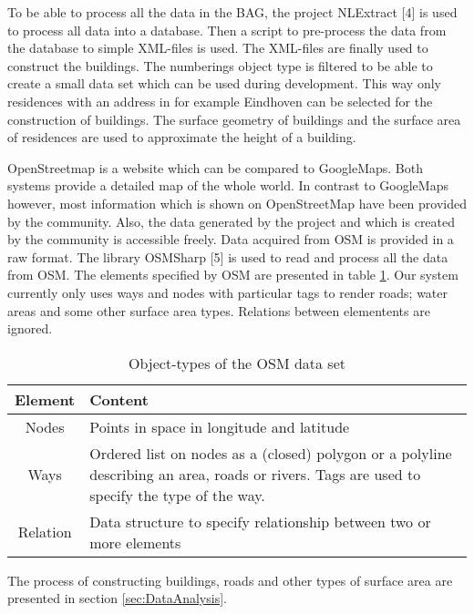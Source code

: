 To be able to process all the data in the BAG, the project NLExtract [4] is used to process all data into a database. Then a script to pre-process the data from the database to simple XML-files is used. The XML-files are finally used to construct the buildings. The numberings object type is filtered to be able to create a small data set which can be used during development. This way only residences with an address in for example Eindhoven can be selected for the construction of buildings. The surface geometry of buildings and the surface area of residences are used to approximate the height of a building.

OpenStreetmap is a website which can be compared to GoogleMaps. Both systems provide a detailed map of the whole world. In contrast to GoogleMaps however, most information which is shown on OpenStreetMap have been provided by the community. Also, the data generated by the project and which is created by the community is accessible freely. Data acquired from OSM is provided in a raw format. The library OSMSharp [5] is used to read and process all the data from OSM. The elements specified by OSM are presented in table \ref{Table:ObjectTypesOSM}. Our system currently only uses ways and nodes with particular tags to render roads; water areas and some other surface area types. Relations between elementents are ignored.
\begin{table}[h]
    \centering
    \begin{tabular}{c p{10cm}}
       \textbf{Element} &  \textbf{Content}     \\ \hline
      Nodes & Points in space in longitude and latitude  \\ \hline
      Ways & Ordered list on nodes as a (closed) polygon or a polyline describing an area, roads or rivers. Tags are used to specify the type of the way.  \\ \hline
      Relation & Data structure to specify relationship between two or more elements  \\
    \end{tabular}
    \caption{Object-types of the OSM data set}
    \label{Table:ObjectTypesOSM}
\end{table} 

The process of constructing buildings, roads and other types of surface area are presented in section \ref{sec:DataAnalysis}.